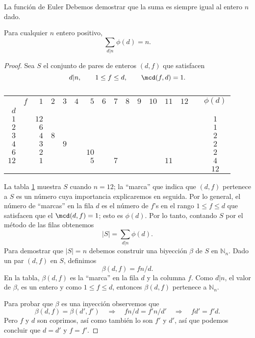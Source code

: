 \begin{section}{La función de Euler}
Debemos demostrar que la suma es siempre igual al entero $n$ dado.

\begin{teorema}\label{tA2.1b} Para cualquier $n$ entero positivo,
$$
\sum_{d|n} \phi(d)=n.
$$
\end{teorema}
\begin{proof} Sea $S$ el conjunto de pares de enteros $(d,f)$ que
satisfacen
$$
d|n, \qquad 1\le f \le d, \qquad \mcd(f,d)=1.
$$


\begin{table}
\begin{tabular}{rr|rrrrrrrrrrrrr|c}
  &$f$ &$1$  &$2$ &$3$ &$4$ &$5$  &$6$ &$7$ &$8$ &$9$ &$10$ &$11$ &$12$ & &$\phi(d)$\\
$d$ &  &   &  &  &  &   &  &  &  &  &   &   &   & &   \\\hline
$1$ &  &$12$ &  &  &  &   &  &  &  &  &   &   &   & &$1$  \\
$2$ &  &$6$  &  &  &  &   &  &  &  &  &   &   &   & &$1$  \\
$3$ &  &$4$  &$8$ &  &  &   &  &  &  &  &   &   &   & &$2$  \\
$4$ &  &$3$  &  &$9$ &  &   &  &  &  &  &   &   &   & &$2$  \\
$6$ &  &$2$  &  &  &  &$10$ &  &  &  &  &   &   &   & &$2$  \\
$12$&  &$1$  &  &  &  &$5$  &  &$7$ &  &  &   &$11$ &   & &$4$  \\
  &  &   &  &  &  &   &  &  &  &  &   &   &   & &$12$
\end{tabular}
\caption{} \label{tablaA2.1.2}
\end{table}


La tabla \ref{tablaA2.1.2} muestra $S$ cuando $n=12$; la ``marca'' que indica que $(d,f)$ pertenece a $S$ es un número cuya importancia explicaremos en seguida. Por lo general, el número de ``marcas'' en la fila $d$ es el número de $f$'s en el rango $1\le f\le d$ que satisfacen que el $\mcd(d,f)=1$; esto es $\phi(d)$. Por lo tanto, contando $S$ por el método de las filas obtenemos
$$
|S| = \sum_{d|n} \phi(d).
$$
Para demostrar que $|S|=n$ debemos construir una biyección $\beta$ de $S$ en $\mathbb N_n$. Dado un par $(d,f)$ en $S$, definimos
$$
\beta(d,f) = f n/d.
$$
En la tabla, $\beta(d,f)$ es la ``marca'' en la fila $d$ y la columna $f$. Como $d| n$, el valor de $\beta$, es un entero y como $1\le f\le d$, entonces $\beta(d,f)$ pertenece a $\mathbb N_n$.

Para probar que $\beta$ es una inyección observemos que
$$
\beta(d,f) = \beta(d',f') \quad \Rightarrow \quad fn/d = f'n/d'
\quad \Rightarrow \quad fd'=f'd.
$$
Pero $f$ y $d$ son coprimos, así como también lo son $f'$ y $d'$, así que podemos concluir que $d=d'$ y $f=f'$.


\end{proof}
\end{section}
